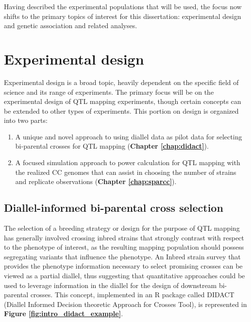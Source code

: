 Having described the experimental populations that will be used, the focus now shifts to the primary topics of interest for this dissertation: experimental design and genetic association and related analyses.

\section{Experimental design}

Experimental design is a broad topic, heavily dependent on the specific field of science and its range of experiments. The primary focus will be on the experimental design of QTL mapping experiments, though certain concepts can be extended to other types of experiments. This portion on design is organized into two parts:
\begin{enumerate}
	\item A unique and novel approach to using diallel data as pilot data for selecting bi-parental crosses for QTL mapping (\textbf{Chapter \ref{chap:didact}}).
	\item A focused simulation approach to power calculation for QTL mapping with the realized CC genomes that can assist in choosing the number of strains and replicate observations (\textbf{Chapter \ref{chap:sparcc}}).
\end{enumerate}

\subsection{Diallel-informed bi-parental cross selection}

The selection of a breeding strategy or design for the purpose of QTL mapping has generally involved crossing inbred strains that strongly contrast with respect to the phenotype of interest, as the resulting mapping population should possess segregating variants that influence the phenotype. An Inbred strain survey \citep{Phillippi2014,Rasmussen2014,McMullan2016,Roberts2018} that provides the phenotype information necessary to select promising crosses can be viewed as a partial diallel, thus suggesting that quantitative approaches could be used to leverage information in the diallel for the design of downstream bi-parental crosses. This concept, implemented in an R package called DIDACT (Diallel Informed Decision theoretic Approach for Crosses Tool), is represented in \textbf{Figure \ref{fig:intro_didact_example}}.

